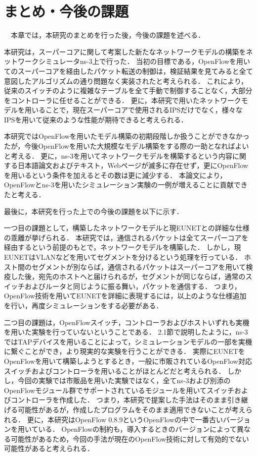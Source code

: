 \chapter{まとめ・今後の課題}

　本章では，本研究のまとめを行った後，今後の課題を述べる．

本研究は，スーパーコアに関して考案した新たなネットワークモデルの構築をネットワークシミュレータns-3上で行った．
当初の目標である，OpenFlowを用いてのスーパーコアを経由したパケット転送の制御は，検証結果を見てみると全て意図したアルゴリズムの通り問題なく実装されたと考えられる．
これにより，従来のスイッチのように複雑なテーブルを全て手動で制御することなく，大部分をコントローラに任せることができる．
更に，本研究で用いたネットワークモデルを用いることで，現在スーパーコアで使用されるIPSだけでなく，様々なIPSを用いて従来のような性能が期待できると考えられる．

本研究ではOpenFlowを用いたモデル構築の初期段階しか扱うことができなかったが，今後OpenFlowを用いた大規模なモデル構築をする際の一助となればよいと考える．
更に，ns-3を用いてネットワークモデルを構築するという内容に関する日本語論文およびテキスト，Webページが滅多に存在せず，更にOpenFlowを用いるという条件を加えるとその数は更に減少する．
本論文により，OpenFlowとns-3を用いたシミュレーション実験の一例が増えることに貢献できたと考える．

最後に，本研究を行った上での今後の課題を以下に示す．

一つ目の課題として，構築したネットワークモデルと現EUNETとの詳細な仕様の乖離が挙げられる．
本研究では，通信されるパケットは全てスーパーコアを経由するという前提のもとで，ネットワークモデルを構築した．
しかし，現EUNETはVLANなどを用いてセグメントを分けるという処理を行っている．
ホスト間のセグメントが別ならば，通信されるパケットはスーパーコアを用いて検疫した後，宛先のホストへと届けられるが，セグメントが同じならば，通常のスイッチおよびルータと同じように振る舞い，パケットを通信する．
つまり，OpenFlow技術を用いてEUNETを詳細に表現するには，以上のような仕様追加を行い，再度シミュレーションをする必要がある．

二つ目の課題は，OpenFlowスイッチ，コントローラおよびホストいずれも実機を用いた実験を行っていないということである．
2.1節で説明したように，ns-3ではTAPデバイスを用いることによって，シミュレーションモデルの一部を実機に繋ぐことができ，より現実的な実験を行うことができる．
実際にEUNETをOpenFlowを用いて構築しようとするとき，一般に市販されているOpenFlow対応スイッチおよびコントローラを用いることがほとんどだと考えられる．
しかし，今回の実験では市販品を用いた実験ではなく，全てns-3および別添のOpenFlowモジュール群でサポートされているモジュールを用いてスイッチおよびコントローラを作成した．
つまり，本研究で提案した手法はそのまま引き継げる可能性があるが，作成したプログラムをそのまま適用できないことが考えられる．
更に，本研究はOpenFlow 0.8.9というOpenFlowの中で一番古いバージョンを用いている．
OpenFlowの制約も，導入するときのバージョンによって異なる可能性があるため，今回の手法が現在のOpenFlow技術に対して有効的でない可能性があると考えられる．